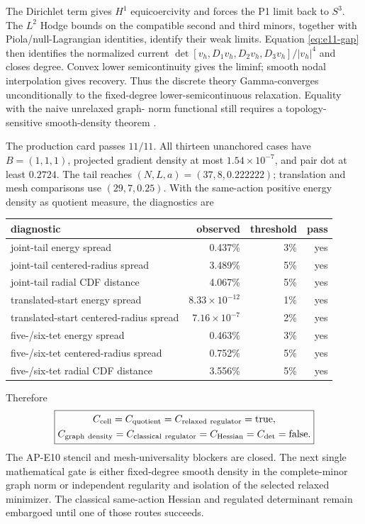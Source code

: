 The Dirichlet term gives $H^1$ equicoercivity and forces the P1 limit back to
$S^3$.  The $L^2$ Hodge bounds on the compatible second and third minors,
together with Piola/null-Lagrangian identities, identify their weak limits.
Equation \eqref{eq:e11-gap} then identifies the normalized current
$\det[v_h,D_1v_h,D_2v_h,D_3v_h]/|v_h|^4$ and closes degree.  Convex lower
semicontinuity gives the liminf; smooth nodal interpolation gives recovery.
Thus the discrete theory Gamma-converges unconditionally to the fixed-degree
lower-semicontinuous relaxation.  Equality with the naive unrelaxed graph-
norm functional still requires a topology-sensitive smooth-density theorem
\cite{Bethuel1991}.

The production card passes $11/11$.  All thirteen unanchored cases have
$B=(1,1,1)$, projected gradient density at most $1.54\times10^{-7}$, and pair
dot at least $0.2724$.  The tail reaches $(N,L,a)=(37,8,0.222222)$; translation
and mesh comparisons use $(29,7,0.25)$.  With the same-action positive energy
density as quotient measure, the diagnostics are
\begin{center}
\begin{tabular}{lrrr}
\toprule
diagnostic&observed&threshold&pass\\
\midrule
joint-tail energy spread&0.437\%&3\%&yes\\
joint-tail centered-radius spread&3.489\%&5\%&yes\\
joint-tail radial CDF distance&4.067\%&5\%&yes\\
translated-start energy spread&$8.33\times10^{-12}$&1\%&yes\\
translated-start centered-radius spread&$7.16\times10^{-7}$&2\%&yes\\
five-/six-tet energy spread&0.463\%&3\%&yes\\
five-/six-tet centered-radius spread&0.752\%&5\%&yes\\
five-/six-tet radial CDF distance&3.556\%&5\%&yes\\
\bottomrule
\end{tabular}
\end{center}
Therefore
\begin{equation}
 \boxed{\begin{gathered}
 C_{\rm cell}=C_{\rm quotient}
 =C_{\rm relaxed\ regulator}=\mathrm{true},\\
 C_{\rm graph\ density}=C_{\rm classical\ regulator}
 =C_{\rm Hessian}=C_{\det}=\mathrm{false}.
 \end{gathered}}
 \label{eq:e11-decision}
\end{equation}
The AP-E10 stencil and mesh-universality blockers are closed.  The next
single mathematical gate is either fixed-degree smooth density in the
complete-minor graph norm or independent regularity and isolation of the
selected relaxed minimizer.  The classical same-action Hessian and regulated
determinant remain embargoed until one of those routes succeeds.
